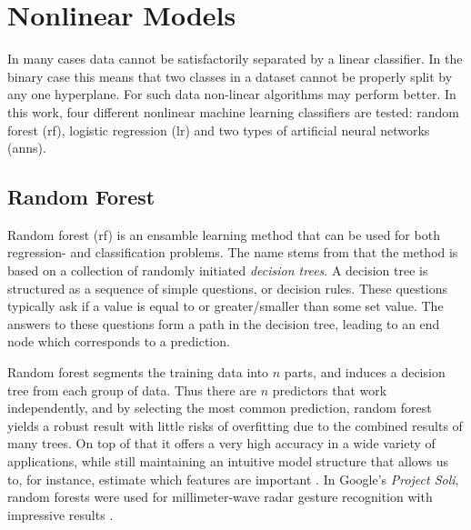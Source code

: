 \section{Nonlinear Models}

In many cases data cannot be satisfactorily separated by a linear classifier. In the binary case this means that two classes in a dataset cannot be properly split by any one hyperplane. For such data non-linear algorithms may perform better. In this work, four different nonlinear machine learning classifiers are tested: random forest (\gls{rf}), logistic regression (\gls{lr}) and two types of artificial neural networks (\gls{ann}s). 



\subsection{Random Forest}
Random forest (\gls{rf}) is an ensamble learning method that can be used for both regression- and classification problems. The name stems from that the method is based on a collection of randomly initiated \textit{decision trees}. A decision tree is structured as a sequence of simple questions, or decision rules. These questions typically ask if a value is equal to or greater/smaller than some set value. The answers to these questions form a path in the decision tree, leading to an end node which corresponds to a prediction.

Random forest segments the training data into $n$ parts, and induces a decision tree from each group of data. Thus there are $n$ predictors that work independently, and by selecting the most common prediction, random forest yields a robust result with little risks of overfitting due to the combined results of many trees. On top of that it offers a very high accuracy in a wide variety of applications, while still maintaining an intuitive model structure that allows us to, for instance, estimate which features are important \citep{breiman_2002}. In Google's \emph{Project Soli}, random forests were used for millimeter-wave radar gesture recognition with impressive results \citep{lien_gillian_karagozler_amihood_schwesig_olson_raja_poupyrev_2016}. 

